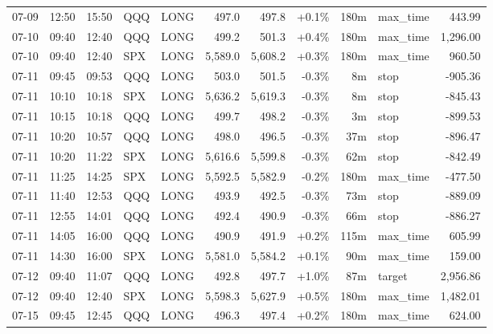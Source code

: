 \documentclass[11pt,a4paper,twoside]{article}
\begin{document}
\begin{center}
\begin{longtable}{>{\color{txtmain}}l l l l l r r r r >{\color{txtmain}}l r}
07-09 & 12:50 & 15:50 & QQQ & LONG & 497.0 & 497.8 & \textcolor{wingreen}{+0.1\%} & 180m & max\_time & \textcolor{wingreen}{443.99} \\
07-10 & 09:40 & 12:40 & QQQ & LONG & 499.2 & 501.3 & \textcolor{wingreen}{+0.4\%} & 180m & max\_time & \textcolor{wingreen}{1,296.00} \\
07-10 & 09:40 & 12:40 & SPX & LONG & 5,589.0 & 5,608.2 & \textcolor{wingreen}{+0.3\%} & 180m & max\_time & \textcolor{wingreen}{960.50} \\
07-11 & 09:45 & 09:53 & QQQ & LONG & 503.0 & 501.5 & \textcolor{lossred}{-0.3\%} & 8m & stop & \textcolor{lossred}{-905.36} \\
07-11 & 10:10 & 10:18 & SPX & LONG & 5,636.2 & 5,619.3 & \textcolor{lossred}{-0.3\%} & 8m & stop & \textcolor{lossred}{-845.43} \\
07-11 & 10:15 & 10:18 & QQQ & LONG & 499.7 & 498.2 & \textcolor{lossred}{-0.3\%} & 3m & stop & \textcolor{lossred}{-899.53} \\
07-11 & 10:20 & 10:57 & QQQ & LONG & 498.0 & 496.5 & \textcolor{lossred}{-0.3\%} & 37m & stop & \textcolor{lossred}{-896.47} \\
07-11 & 10:20 & 11:22 & SPX & LONG & 5,616.6 & 5,599.8 & \textcolor{lossred}{-0.3\%} & 62m & stop & \textcolor{lossred}{-842.49} \\
07-11 & 11:25 & 14:25 & SPX & LONG & 5,592.5 & 5,582.9 & \textcolor{lossred}{-0.2\%} & 180m & max\_time & \textcolor{lossred}{-477.50} \\
07-11 & 11:40 & 12:53 & QQQ & LONG & 493.9 & 492.5 & \textcolor{lossred}{-0.3\%} & 73m & stop & \textcolor{lossred}{-889.09} \\
07-11 & 12:55 & 14:01 & QQQ & LONG & 492.4 & 490.9 & \textcolor{lossred}{-0.3\%} & 66m & stop & \textcolor{lossred}{-886.27} \\
07-11 & 14:05 & 16:00 & QQQ & LONG & 490.9 & 491.9 & \textcolor{wingreen}{+0.2\%} & 115m & max\_time & \textcolor{wingreen}{605.99} \\
07-11 & 14:30 & 16:00 & SPX & LONG & 5,581.0 & 5,584.2 & \textcolor{wingreen}{+0.1\%} & 90m & max\_time & \textcolor{wingreen}{159.00} \\
07-12 & 09:40 & 11:07 & QQQ & LONG & 492.8 & 497.7 & \textcolor{wingreen}{+1.0\%} & 87m & target & \textcolor{wingreen}{2,956.86} \\
07-12 & 09:40 & 12:40 & SPX & LONG & 5,598.3 & 5,627.9 & \textcolor{wingreen}{+0.5\%} & 180m & max\_time & \textcolor{wingreen}{1,482.01} \\
07-15 & 09:45 & 12:45 & QQQ & LONG & 496.3 & 497.4 & \textcolor{wingreen}{+0.2\%} & 180m & max\_time & \textcolor{wingreen}{624.00} \\

\end{longtable}
\end{center}
\end{document}
